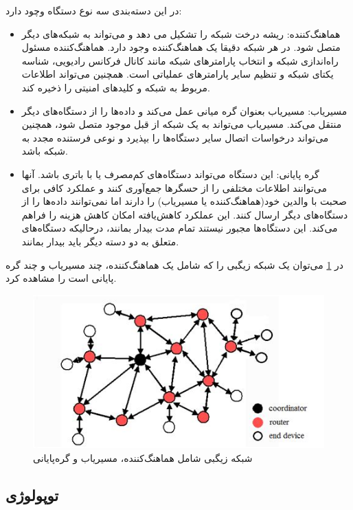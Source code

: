 در این دسته‌بندی سه نوع دستگاه وچود دارد:
\begin{itemize}
\item هماهنگ‌کننده: ریشه درخت شبکه را تشکیل می دهد و می‌تواند به شبکه‌های دیگر متصل شود. در هر شبکه دقیقا یک هماهنگ‌کننده وجود دارد. هماهنگ‌کننده مسئول راه‌اندازی شبکه و انتخاب پارامترهای شبکه مانند کانال فرکانس رادیویی، شناسه یکتای شبکه و تنظیم سایر پارامترهای عملیاتی است. همچنین می‌تواند اطلاعات مربوط به شبکه و کلیدهای امنیتی را ذخیره کند\cite{ramya2011study}.
\item مسیریاب: مسیریاب بعنوان گره‌ میانی عمل می‌کند و داده‌ها را از دستگاه‌های دیگر منتقل می‌کند. مسیریاب می‌تواند به یک شبکه از قبل موجود متصل شود، همچنین می‌تواند درخواسات اتصال سایر دستگاه‌ها را بپذیرد و نوعی فرستنده مجدد به شبکه باشد\cite{ramya2011study}.
\item گره پایانی: این دستگاه می‌تواند دستگاه‌های کم‌مصرف یا با باتری باشد. آنها می‌توانند اطلاعات مختلفی را از حسگرها جمع‌آوری کنند و عملکرد کافی برای صحبت با والدین خود(هماهنگ‌کننده یا مسیریاب) را دارند اما نمی‌توانند داده‌ها را از دستگاه‌های دیگر ارسال کنند. این عملکرد کاهش‌یافته امکان کاهش هزینه را فراهم می‌کند. این دستگاه‌ها مجبور نیستند تمام مدت بیدار بمانند، درحالیکه دستگاه‌های متعلق به دو دسته دیگر باید بیدار بمانند\cite{ramya2011study}. 
\end{itemize}

در \cref{fig:zigbee_network} \cite{song2019research} می‌توان یک شبکه زیگبی را که شامل یک هماهنگ‌کننده، چند مسیریاب و چند گره پایانی است را مشاهده کرد.

\begin{figure}[!h]
\centering\includegraphics[scale=1]{zigbee_network.png}
\caption{شبکه زیگبی شامل هماهنگ‌کننده، مسیریاب و گره‌پایانی \cite{song2019research}}\label{fig:zigbee_network}
\end{figure}

\subsection{توپولوژی}

